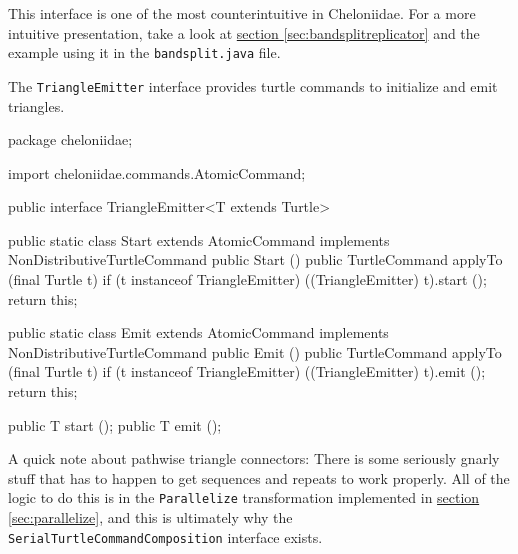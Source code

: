 \documentclass{report}
\newcommand{\Ref}[2]{\hyperref[#2]{#1 \ref*{#2}}}
\begin{document}
      This interface is one of the most counterintuitive in Cheloniidae. For a more intuitive presentation, take a look at
      \Ref{section}{sec:bandsplitreplicator} and the example using it in the {\tt bandsplit.java} file.

      The {\tt TriangleEmitter} interface provides turtle commands to initialize and emit triangles.

\begin{javacode}
package cheloniidae;

import cheloniidae.commands.AtomicCommand;

public interface TriangleEmitter<T extends Turtle> {
  public static class Start extends AtomicCommand implements NonDistributiveTurtleCommand {
    public Start () {}
    public TurtleCommand applyTo (final Turtle t) {
      if (t instanceof TriangleEmitter) ((TriangleEmitter) t).start ();
      return this;
    }
  }

  public static class Emit extends AtomicCommand implements NonDistributiveTurtleCommand {
    public Emit () {}
    public TurtleCommand applyTo (final Turtle t) {
      if (t instanceof TriangleEmitter) ((TriangleEmitter) t).emit ();
      return this;
    }
  }

  public T start ();
  public T emit ();
}
\end{javacode}

      A quick note about pathwise triangle connectors: There is some seriously gnarly stuff that has to happen to get sequences and repeats to work properly.
      All of the logic to do this is in the {\tt Parallelize} transformation implemented in \Ref{section}{sec:parallelize}, and this is ultimately why the {\tt
      SerialTurtleCommandComposition} interface exists.
\end{document}
